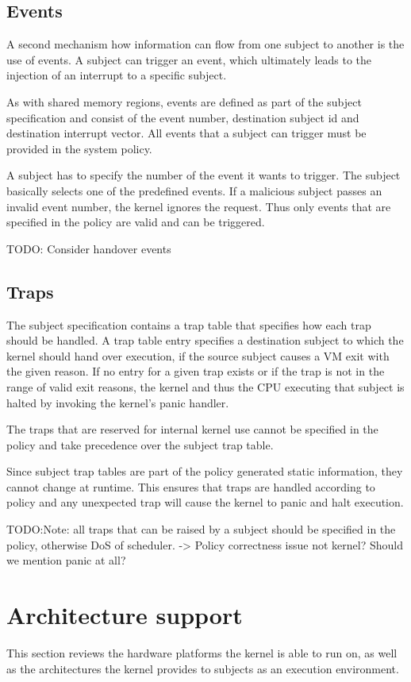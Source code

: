 \subsection{Events}
A second mechanism how information can flow from one subject to another is the
use of events. A subject can trigger an event, which ultimately leads to the
injection of an interrupt to a specific subject.

As with shared memory regions, events are defined as part of the subject
specification and consist of the event number, destination subject id and
destination interrupt vector. All events that a subject can trigger must be
provided in the system policy.

A subject has to specify the number of the event it wants to trigger. The
subject basically selects one of the predefined events. If a malicious subject
passes an invalid event number, the kernel ignores the request. Thus only events
that are specified in the policy are valid and can be triggered.

TODO: Consider handover events

\subsection{Traps}
The subject specification contains a trap table that specifies how each trap
should be handled. A trap table entry specifies a destination subject to which
the kernel should hand over execution, if the source subject causes a VM exit
with the given reason. If no entry for a given trap exists or if the trap is not
in the range of valid exit reasons, the kernel and thus the CPU executing that
subject is halted by invoking the kernel's panic handler.

The traps that are reserved for internal kernel use cannot be specified in the
policy and take precedence over the subject trap table.

Since subject trap tables are part of the policy generated static information,
they cannot change at runtime. This ensures that traps are handled according to
policy and any unexpected trap will cause the kernel to panic and halt
execution.

TODO:Note: all traps that can be raised by a subject should be specified in the
policy, otherwise DoS of scheduler. -> Policy correctness issue not kernel? Should
we mention panic at all?

\section{Architecture support}
This section reviews the hardware platforms the kernel is able to run on, as
well as the architectures the kernel provides to subjects as an execution
environment.

